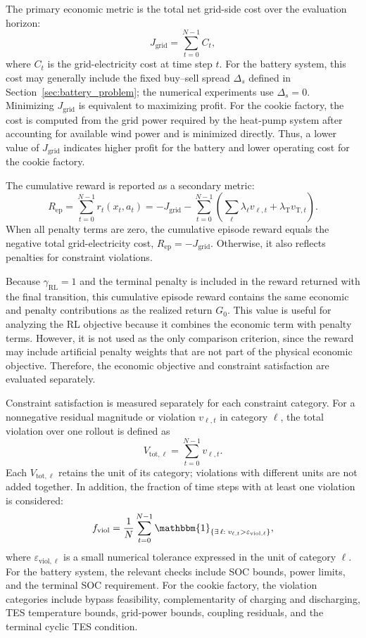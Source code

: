 \documentclass[12pt]{article}
\begin{document}
The primary economic metric is the total net grid-side cost over the evaluation horizon:
\[
J_{\mathrm{grid}} = \sum_{t=0}^{N-1} C_t,
\]
where $C_t$ is the grid-electricity cost at time step $t$. For the battery system, this cost may generally include the fixed buy--sell spread $\Delta_s$ defined in Section~\ref{sec:battery_problem}; the numerical experiments use $\Delta_s=0$. Minimizing $J_{\mathrm{grid}}$ is equivalent to maximizing profit. For the cookie factory, the cost is computed from the grid power required by the heat-pump system after accounting for available wind power and is minimized directly. Thus, a lower value of $J_{\mathrm{grid}}$ indicates higher profit for the battery and lower operating cost for the cookie factory.

The cumulative reward is reported as a secondary metric:
\[
R_{\mathrm{ep}} = \sum_{t=0}^{N-1} r_t(x_t,a_t)
= -J_{\mathrm{grid}}
- \sum_{t=0}^{N-1}\left(\sum_{\ell}\lambda_\ell v_{\ell,t}
+ \lambda_{\mathrm T}v_{\mathrm T,t}\right).
\]
When all penalty terms are zero, the cumulative episode reward equals the negative total grid-electricity cost, $R_{\mathrm{ep}}=-J_{\mathrm{grid}}$. Otherwise, it also reflects penalties for constraint violations.

Because $\gamma_{\mathrm{RL}}=1$ and the terminal penalty is included in the reward returned with the final transition, this cumulative episode reward contains the same economic and penalty contributions as the realized return $G_0$.
This value is useful for analyzing the RL objective because it combines the economic term with penalty terms. However, it is not used as the only comparison criterion, since the reward may include artificial penalty weights that are not part of the physical economic objective. Therefore, the economic objective and constraint satisfaction are evaluated separately.

Constraint satisfaction is measured separately for each constraint category. For a nonnegative residual magnitude or violation $v_{\ell,t}$ in category $\ell$, the total violation over one rollout is defined as
\[
V_{\mathrm{tot},\ell} = \sum_{t=0}^{N-1} v_{\ell,t}.
\]
Each $V_{\mathrm{tot},\ell}$ retains the unit of its category; violations with different units are not added together. In addition, the fraction of time steps with at least one violation is considered:
\[
f_{\mathrm{viol}} =
\frac{1}{N}\sum_{t=0}^{N-1}
\mathbbm{1}_{\{\exists\,\ell:\;v_{\ell,t} > \varepsilon_{\mathrm{viol},\ell}\}},
\]
where $\varepsilon_{\mathrm{viol},\ell}$ is a small numerical tolerance expressed in the unit of category $\ell$. For the battery system, the relevant checks include SOC bounds, power limits, and the terminal SOC requirement. For the cookie factory, the violation categories include bypass feasibility, complementarity of charging and discharging, TES temperature bounds, grid-power bounds, coupling residuals, and the terminal cyclic TES condition.
\end{document}
